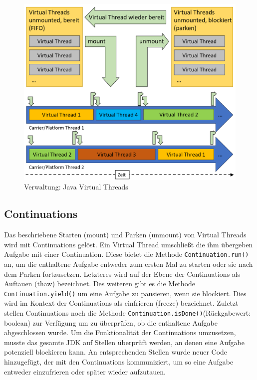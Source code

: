 \documentclass[fontsize=12pt,paper=a4,twoside=semi,parskip=half-,headsepline,headinclude]{scrreprt}
\newcommand{\code}[1]{\texttt{#1}}
\begin{document}
\begin{figure}[h]
	\centering
	\includegraphics[scale=0.5]{figures/VirtualThreadsAblauf.png}
	\caption{Verwaltung: Java Virtual Threads}
	\label{fig:VirtualThreadsAblauf}
\end{figure}

\subsection{Continuations}

Das beschriebene Starten (mount) und Parken (unmount) von Virtual Threads wird mit Continuations gelöst. Ein Virtual Thread umschließt die ihm übergeben Aufgabe mit einer Continuation. Diese bietet die Methode \code{Continuation.run()} an, um die enthaltene Aufgabe entweder zum ersten Mal zu starten oder sie nach dem Parken fortzusetzen. Letzteres wird auf der Ebene der Continuations als Auftauen (thaw) bezeichnet. Des weiteren gibt es die Methode \code{Continuation.yield()} um eine Aufgabe zu pausieren, wenn sie blockiert. Dies wird im Kontext der Continuations als einfrieren (freeze) bezeichnet. Zuletzt stellen Continuations noch die Methode \code{Continuation.isDone()}(Rückgabewert: boolean) zur Verfügung um zu überprüfen, ob die enthaltene Aufgabe abgeschlossen wurde. Um die Funktionalität der Continuations umzusetzen, musste das gesamte JDK auf Stellen überprüft werden, an denen eine Aufgabe potenziell blockieren kann. An entsprechenden Stellen wurde neuer Code hinzugefügt, der mit den Continuations kommuniziert, um so eine Aufgabe entweder einzufrieren oder später wieder aufzutauen.\cite{Pressler2023b}
\end{document}
